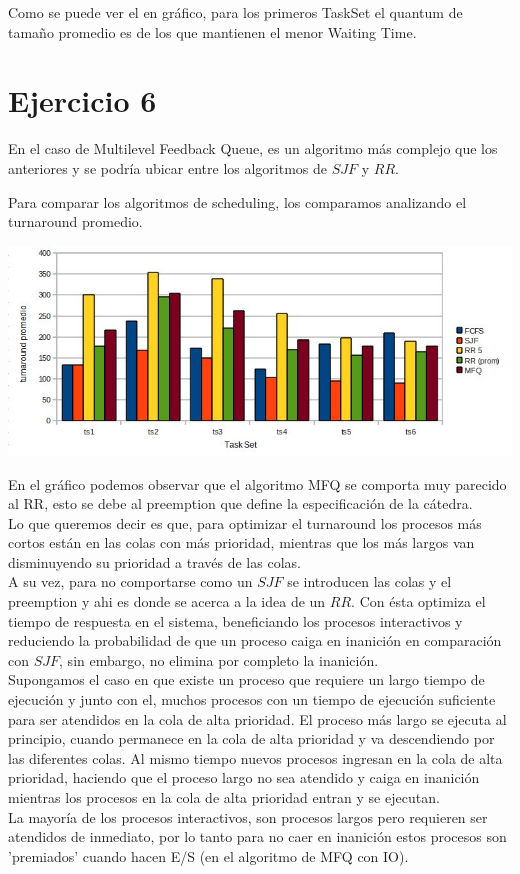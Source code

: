 \documentclass[a4paper, 10pt]{article}
\begin{document}
Como se puede ver el en gr\'afico, para los primeros TaskSet el quantum de tama\~no promedio es de los que mantienen el menor Waiting Time.


\newpage
\section{Ejercicio 6}
	 En el caso de Multilevel Feedback Queue, es un algoritmo m\'as complejo que los anteriores y se podr\'ia ubicar entre los algoritmos de $SJF$ y $RR$.
	
Para comparar los algoritmos de scheduling, los comparamos analizando el turnaround promedio.\\

\begin{center}
	\includegraphics[scale=0.6]{graficos/turnArround.jpg}
\end{center}
En el gr\'afico podemos observar que el algoritmo MFQ se comporta muy parecido al RR, esto se debe al preemption que define la especificaci\'on de la c\'atedra. \\


Lo que queremos decir es que, para optimizar el turnaround los procesos m\'as cortos est\'an en las colas con m\'as prioridad, mientras que los m\'as largos van disminuyendo su prioridad a trav\'es de las colas.\\
 A su vez, para no comportarse como un $SJF$ se introducen las colas y el preemption y ahi es donde se acerca a la idea de un $RR$. Con \'esta optimiza el tiempo de respuesta en el sistema, beneficiando los procesos interactivos y reduciendo la probabilidad de que un proceso caiga en inanici\'on en comparaci\'on con $SJF$, sin embargo, no elimina por completo la inanici\'on.\\

Supongamos el caso en que existe un proceso que requiere un largo tiempo de ejecuci\'on y junto con el, muchos procesos con un tiempo de ejecuci\'on suficiente para ser atendidos en la cola de alta prioridad.
El proceso m\'as largo se ejecuta al principio, cuando permanece en la cola de alta prioridad y va descendiendo por las diferentes colas. Al mismo tiempo nuevos procesos ingresan en la cola de alta prioridad, haciendo que el proceso largo no sea atendido y caiga en inanici\'on mientras los procesos en la cola de alta prioridad entran y se ejecutan.\\

La mayor\'ia de los procesos interactivos, son procesos largos pero requieren ser atendidos de inmediato, por lo tanto para no caer en inanici\'on estos procesos son 'premiados' cuando hacen E/S (en el algoritmo de MFQ con IO).
\end{document}
